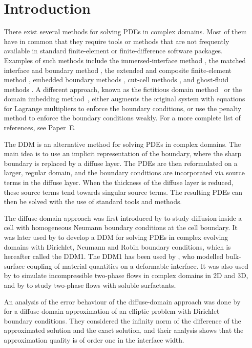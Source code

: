 \documentclass[11pt,b5paper,DIV=calc,BCOR1.3cm,headings=small,%
               footinclude=false,headsepline]{scrbook}
\begin{document}
\section{Introduction}
There exist several methods for solving PDEs in complex domains.  Most of them
have in common that they require tools or methods that are not frequently
available in standard finite-element or finite-difference software packages.
Examples of such methods include the immersed-interface method
\cite{LeVeque94}, the matched interface and boundary method \cite{Zhou06}, the
extended and composite finite-element method \cite{Dolbow09}, embedded boundary
methods \cite{Johansen98}, cut-cell methods \cite{Ji06}, and ghost-fluid
methods \cite{Fedkiw99}.  A different approach, known as the fictitious domain
method~\cite{Glowinski94,Glowinski96} or the domain imbedding
method~\cite{Buzbee71}, either augments the original system with equations for
Lagrange multipliers to enforce the boundary conditions, or use the penalty
method to enforce the boundary conditions weakly.  For a more complete list of
references, see Paper~E.

The DDM is an alternative method for solving PDEs in complex domains.  The main
idea is to use an implicit representation of the boundary, where the sharp
boundary is replaced by a diffuse layer.  The PDEs are then reformulated on
a larger, regular domain, and the boundary conditions are incorporated via
source terms in the diffuse layer.  When the thickness of the diffuse layer is
reduced, these source terms tend towards singular source terms.  The resulting
PDEs can then be solved with the use of standard tools and methods.

The diffuse-domain approach was first introduced by \citet{Kockelkoren03} to
study diffusion inside a cell with homogeneous Neumann boundary conditions at
the cell boundary.  It was later used by \citet{Li09} to develop a DDM for
solving PDEs in complex evolving domains with Dirichlet, Neumann and Robin
boundary conditions, which is hereafter called the DDM1.  The DDM1 has been
used by \citet{Teigen09-b}, who modelled bulk-surface coupling of material
quantities on a deformable interface.  It was also used by \citet{Aland10} to
simulate incompressible two-phase flows in complex domains in 2D and 3D, and by
\citet{Teigen11} to study two-phase flows with soluble surfactants.

An analysis of the error behaviour of the diffuse-domain approach was done by
\citet{Franz12} for a diffuse-domain approximation of an elliptic problem with
Dirichlet boundary conditions.  They considered the infinity norm of the
difference of the approximated solution and the exact solution, and their
analysis shows that the approximation quality is of order one in the interface
width.
\end{document}
